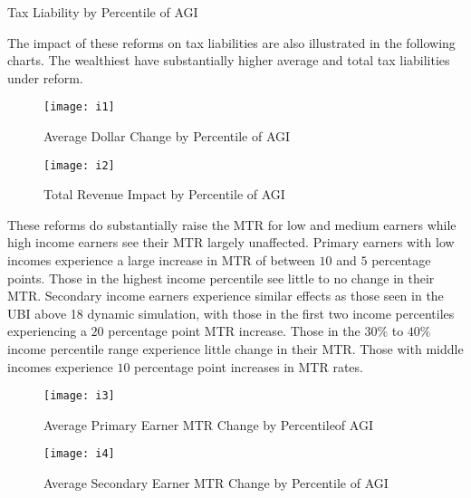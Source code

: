 \documentclass{article}
\begin{document}
\begin{table}[H]
\caption{Tax Liability by Percentile of AGI}

\begin{center}
\begin{adjustbox}{max width=\textwidth}

\end{adjustbox}
\end{center}
\end{table}

The impact of these reforms on tax liabilities are also illustrated in the following charts. The wealthiest have substantially higher average and total tax liabilities under reform.

\begin{figure}[H]
\centering
\caption{Average Dollar Change by Percentile of AGI}
\texttt{[image: i1]}
\end{figure}

\begin{figure}[H]
\centering
\caption{Total Revenue Impact by Percentile of AGI}
\texttt{[image: i2]}
\end{figure}

These reforms do substantially raise the MTR for low and medium earners while high income earners see their MTR largely unaffected.
Primary earners with low incomes experience a large increase in MTR of between $10$ and $5$ percentage points. Those in the highest income percentile see little to no change in their MTR. Secondary income earners experience similar effects as those seen in the UBI above 18 dynamic simulation, with those in the first two income percentiles experiencing a $20$ percentage point MTR increase. Those in the $30\%$ to $40\%$ income percentile range experience little change in their MTR. Those with middle incomes experience $10$ percentage point increases in MTR rates.

\begin{figure}[H]
\centering
\caption{Average Primary Earner MTR Change by Percentileof AGI}
\texttt{[image: i3]}
\end{figure}

\begin{figure}[H]
\centering
\caption{Average Secondary Earner MTR Change by Percentile of AGI}
\texttt{[image: i4]}
\end{figure}
\end{document}
